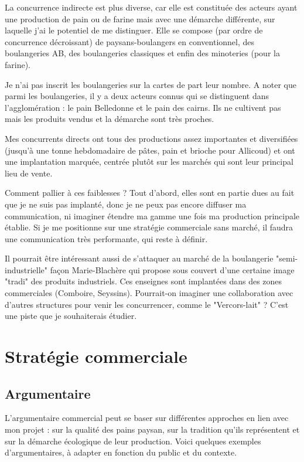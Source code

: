 \documentclass{book}
\begin{document}
La concurrence indirecte est plus diverse, car elle est constituée des acteurs ayant une production de pain ou de farine mais avec une démarche différente, sur laquelle j’ai le potentiel de me distinguer. Elle se compose (par ordre de concurrence décroissant) de paysans-boulangers en conventionnel, des boulangeries AB, des boulangeries classiques et enfin des minoteries (pour la farine). 

Je n’ai pas inscrit les boulangeries sur la cartes de part leur nombre. A noter que parmi les boulangeries, il y a deux acteurs connus qui se distinguent dans l’agglomération : le pain Belledonne et le pain des cairns. Ils ne cultivent pas mais les produits vendus et la démarche sont très proches.

Mes concurrents directs ont tous des productions assez importantes et diversifiées (jusqu’à une tonne hebdomadaire de pâtes, pain et brioche pour Allicoud) et ont une implantation marquée, centrée plutôt sur les marchés qui sont leur principal lieu de vente. 

Comment pallier à ces faiblesses ? Tout d’abord, elles sont en partie dues au fait que je ne suis pas implanté, donc je ne peux pas encore diffuser ma communication, ni imaginer étendre ma gamme une fois ma production principale établie. Si je me positionne sur une stratégie commerciale sans marché, il faudra une communication très performante, qui reste à définir. 

Il pourrait être intéressant aussi de s’attaquer au marché de la boulangerie "semi-industrielle" façon Marie-Blachère qui propose sous couvert d’une certaine image "tradi" des produits industriels. Ces enseignes sont implantées dans des zones commerciales (Comboire, Seyssins). Pourrait-on imaginer une collaboration avec d’autres structures pour venir les concurrencer, comme le "Vercors-lait" ? C’est une piste que je souhaiterais étudier. 

\section{Stratégie commerciale}

\subsection{Argumentaire}

L'argumentaire commercial peut se baser sur différentes approches en lien avec mon projet : sur la qualité des pains paysan, sur la tradition qu'ils représentent et sur la démarche écologique de leur production. Voici quelques exemples d'argumentaires, à adapter en fonction du public et du contexte.
\end{document}
